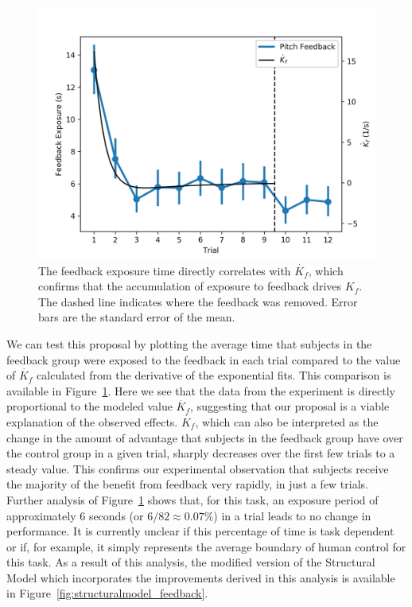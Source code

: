 \begin{figure}[b]
    \centering
    \includegraphics[width=0.8\linewidth]{figures/Modeling/f_v_kfd.png}
    \caption[The feedback exposure time directly correlates with $\dot{K_{f}}$]{The feedback exposure time directly correlates with $\dot{K_{f}}$, which confirms that the accumulation of exposure to feedback drives $K_f$.
        The dashed line indicates where the feedback was removed.
        Error bars are the standard error of the mean.}
    \label{fig:feedback_kfd}
\end{figure}

We can test this proposal by plotting the average time that subjects in the feedback group were exposed to the feedback in each trial compared to the value of $\dot{K_f}$ calculated from the derivative of the exponential fits.
This comparison is available in Figure~\ref{fig:feedback_kfd}.
Here we see that the data from the experiment is directly proportional to the modeled value $\dot{K_f}$, suggesting that our proposal is a viable explanation of the observed effects.
$\dot{K_f}$, which can also be interpreted as the change in the amount of advantage that subjects in the feedback group have over the control group in a given trial, sharply decreases over the first few trials to a steady value.
This confirms our experimental observation that subjects receive the majority of the benefit from feedback very rapidly, in just a few trials.
Further analysis of Figure~\ref{fig:feedback_kfd} shows that, for this task, an exposure period of approximately 6 seconds (or $6/82\approx0.07\%$) in a trial leads to no change in performance.
It is currently unclear if this percentage of time is task dependent or if, for example, it simply represents the average boundary of human control for this task.
As a result of this analysis, the modified version of the Structural Model which incorporates the improvements derived in this analysis is available in Figure~\ref{fig:structuralmodel_feedback}.


